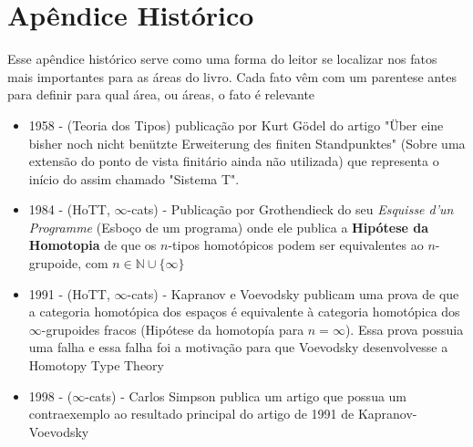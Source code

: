 \documentclass[../main.tex]{subfiles}
\begin{document}
\section{Apêndice Histórico}

Esse apêndice histórico serve como uma forma do leitor se localizar nos fatos mais importantes para as áreas do livro. Cada fato vêm com um parentese antes para definir para qual área, ou áreas, o fato é relevante

\begin{itemize}
    \item  1958 - (Teoria dos Tipos) publicação por Kurt Gödel do artigo "Über eine bisher noch nicht benützte Erweiterung des finiten Standpunktes" (Sobre uma extensão do ponto de vista finitário ainda não utilizada) que representa o início do assim chamado "Sistema T".
    \item 1984 - (HoTT, $\infty$-cats) - Publicação por Grothendieck do seu \emph{Esquisse d'un Programme} (Esboço de um programa) onde ele publica a \textbf{Hipótese da Homotopia} de que os $n$-tipos homotópicos podem ser equivalentes ao $n$-grupoide, com $n \in \mathbb{N} \cup \{\infty\}$ 
    \item 1991 - (HoTT, $\infty$-cats) - Kapranov e Voevodsky publicam uma prova de que a categoria homotópica dos espaços é equivalente à categoria homotópica dos $\infty$-grupoides fracos (Hipótese da homotopía para $n = \infty$). Essa prova possuia uma falha e essa falha foi a motivação para que Voevodsky desenvolvesse a Homotopy Type Theory
    \item 1998 - ($\infty$-cats) - Carlos Simpson publica um artigo que possua um contraexemplo ao resultado principal do artigo de 1991 de Kapranov-Voevodsky
\end{itemize}
\end{document}
